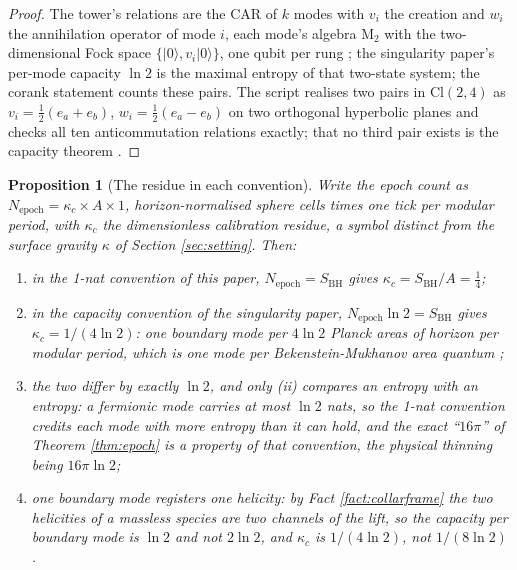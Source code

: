 \documentclass[11pt]{article}
\newtheorem{proposition}[theorem]{Proposition}
\theoremstyle{definition}
\newcommand{\Cl}{\mathrm{Cl}}
\newcommand{\Mat}{\mathrm{M}}
\newcommand{\SBH}{S_{\mathrm{BH}}}
\begin{document}
\begin{proof}
The tower's relations \cite[Prop.~4.1]{ButlerT3} are the CAR of $k$ modes with $v_i$ the creation and $w_i$ the annihilation operator of mode $i$, each mode's algebra $\Mat_2$ with the two-dimensional Fock space $\{|0\rangle, v_i|0\rangle\}$, one qubit per rung \cite[Thm.~4.2]{ButlerT3}; the singularity paper's per-mode capacity $\ln 2$ is the maximal entropy of that two-state system; the corank statement counts these pairs. The script realises two pairs in $\Cl(2,4)$ as $v_i = \tfrac12(e_a + e_b)$, $w_i = \tfrac12(e_a - e_b)$ on two orthogonal hyperbolic planes and checks all ten anticommutation relations exactly; that no third pair exists is the capacity theorem \cite[Thm.~4.3]{ButlerT3}.
\end{proof}

\begin{proposition}[The residue in each convention]\label{prop:residue}
Write the epoch count as $N_{\mathrm{epoch}} = \kappa_c \times A \times 1$, horizon-normalised sphere cells times one tick per modular period, with $\kappa_c$ the dimensionless \emph{calibration residue}, a symbol distinct from the surface gravity $\kappa$ of Section \ref{sec:setting}. Then:
\begin{enumerate}
\item[(i)] in the 1-nat convention of this paper, $N_{\mathrm{epoch}} = \SBH$ gives $\kappa_c = \SBH/A = \tfrac14$;
\item[(ii)] in the capacity convention of the singularity paper, $N_{\mathrm{epoch}}\ln 2 = \SBH$ gives $\kappa_c = 1/(4\ln 2)$: one boundary mode per $4\ln 2$ Planck areas of horizon per modular period, which is one mode per Bekenstein-Mukhanov area quantum \cite{BekensteinMukhanov1995};
\item[(iii)] the two differ by exactly $\ln 2$, and only (ii) compares an entropy with an entropy: a fermionic mode carries at most $\ln 2$ nats, so the 1-nat convention credits each mode with more entropy than it can hold, and the exact ``$16\pi$'' of Theorem \ref{thm:epoch} is a property of that convention, the physical thinning being $16\pi\ln 2$;
\item[(iv)] one boundary mode registers one helicity: by Fact \ref{fact:collarframe} the two helicities of a massless species are two channels of the lift, so the capacity per boundary mode is $\ln 2$ and not $2\ln 2$, and $\kappa_c$ is $1/(4\ln 2)$, not $1/(8\ln 2)$.
\end{enumerate}
\end{proposition}
\end{document}
